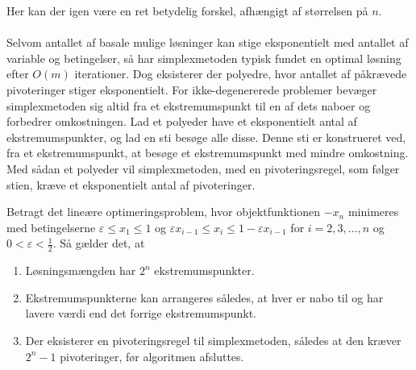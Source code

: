 Her kan der igen være en ret betydelig forskel, afhængigt af størrelsen på $n$.\\\\
%
Selvom antallet af basale mulige løsninger kan stige eksponentielt med antallet af variable og betingelser, så har simplexmetoden typisk fundet en optimal løsning efter $O(m)$ iterationer.
Dog eksisterer der polyedre, hvor antallet af påkrævede pivoteringer  stiger eksponentielt.
For ikke-degenererede problemer bevæger simplexmetoden sig altid fra et ekstremumspunkt til en af dets naboer og forbedrer omkostningen.
Lad et polyeder have et eksponentielt antal af ekstremumspunkter, og lad en sti besøge alle disse.
Denne sti er konstrueret ved, fra et ekstremumspunkt, at besøge et ekstremumspunkt med mindre omkostning.
Med sådan et polyeder vil simplexmetoden, med en pivoteringsregel, som følger stien, kræve et eksponentielt antal af pivoteringer.
\begin{thm}{}{}
Betragt det lineære optimeringsproblem, hvor objektfunktionen $-x_n$ minimeres med betingelserne $\varepsilon \leq x_1 \leq 1$ og $\varepsilon x_{i-1} \leq x_i \leq 1 - \varepsilon x_{i-1}$ for $i = 2, 3, \ldots, n$ og $0 < \varepsilon < \frac{1}{2}$.
Så gælder det, at
%
\begin{enumerate}[label=(\alph*)]
\item Løsningsmængden har $2^n$ ekstremumspunkter.
\item Ekstremumspunkterne kan arrangeres således, at hver er nabo til og har lavere værdi end det forrige ekstremumspunkt.
\item Der eksisterer en pivoteringsregel til simplexmetoden, således at den kræver $2^n-1$ pivoteringer, før algoritmen afsluttes.
\end{enumerate}
%
\end{thm}
%
